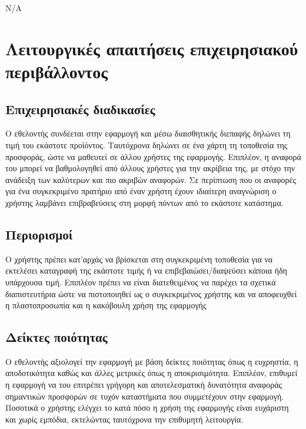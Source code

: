 \documentclass[a4paper,oneside, 12pt]{article}
\begin{document}
N/A

\section{Λειτουργικές απαιτήσεις επιχειρησιακού περιβάλλοντος}
\subsection{Επιχειρησιακές διαδικασίες}
Ο εθελοντής συνδέεται στην εφαρμογή και μέσω διαισθητικής διεπαφής δηλώνει 
τη τιμή του εκάστοτε προϊόντος. Ταυτόχρονα δηλώνει σε ένα χάρτη τη τοποθεσία 
της προσφοράς, ώστε να μαθευτεί σε άλλου χρήστες της εφαρμογής. Επιπλέον, η 
αναφορά του μπορεί να βαθμολογηθεί από άλλους χρήστες για την ακρίβεια της, με στόχο την ανάδειξη των καλύτερων και πιο ακριβών αναφορών. Σε περίπτωση που οι αναφορές για ένα συγκεκριμένο πρατήριο από έναν χρήστη έχουν ιδιαίτερη αναγνώριση ο χρήστης λαμβάνει επιβραβεύσεις στη μορφή πόντων από το εκάστοτε κατάστημα.

\subsection{Περιορισμοί}

Ο χρήστης πρέπει κατ’αρχάς να βρίσκεται στη συγκεκριμένη τοποθεσία για να εκτελέσει καταγραφή της εκάστοτε τιμής ή να επιβεβαιώσει/διαψεύσει κάποια ήδη υπάρχουσα τιμή. Επιπλέον πρέπει να είναι διατεθειμένος να παρέχει τα σχετικά διαπιστευτήρια ώστε να πιστοποιηθεί ως ο συγκεκριμένος χρήστης και να αποφευχθεί η πλαστοπροσωπία και η κακόβουλη χρήση της εφαρμογής  

\subsection{Δείκτες ποιότητας}
Ο εθελοντής αξιολογεί την εφαρμογή με βάση δείκτες ποιότητας όπως η ευχρηστία, η αποδοτικότητα καθώς και άλλες μετρικές όπως η αποκρισιμότητα. Επιπλέον, επιθυμεί η εφαρμογή να του επιτρέπει γρήγορη και αποτελεσματική δυνατότητα αναφοράς σημαντικών προσφορών σε τυχόν καταστήματα που συμμετέχουν στην εφαρμογή. Ποσοτικά ο χρήστης ελέγχει το κατά πόσο η χρήση της εφαρμογής είναι ευχάριστη και χωρίς εμπόδια, εκτελώντας ταυτόχρονα την επιθυμητή λειτουργία.
\end{document}
